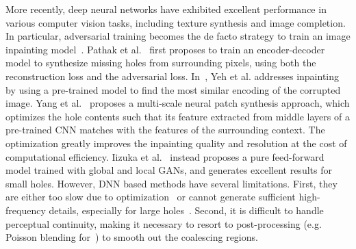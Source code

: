 More recently, deep neural networks have exhibited excellent performance in various computer vision tasks, including texture synthesis and image completion. In particular, adversarial training becomes the de facto strategy to train an image inpainting model~\cite{pathak2016context,yeh2016semantic,li2017generative,yang2017high,iizuka2017globally}. Pathak et al.~\cite{pathak2016context} first proposes to train an encoder-decoder model to synthesize missing holes from surrounding pixels, using both the reconstruction loss and the adversarial loss. In~\cite{yeh2016semantic}, Yeh et al. addresses inpainting by using a pre-trained model to find the most similar encoding of the corrupted image. Yang et al.~\cite{yang2017high} proposes a multi-scale neural patch synthesis approach, which optimizes the hole contents such that its feature extracted from middle layers of a pre-trained CNN matches with the features of the surrounding context. The optimization greatly improves the inpainting quality and resolution at the cost of computational efficiency. Iizuka et al.~\cite{iizuka2017globally} instead proposes a pure feed-forward model trained with global and local GANs, and generates excellent results for small holes. However, DNN based methods have several limitations. First, they are either too slow due to optimization~\cite{yang2017high} or cannot generate sufficient high-frequency details, especially for large holes~\cite{iizuka2017globally}. Second, it is difficult to handle perceptual continuity, making it necessary to resort to post-processing (e.g. Poisson blending for~\cite{iizuka2017globally}) to smooth out the coalescing regions.

